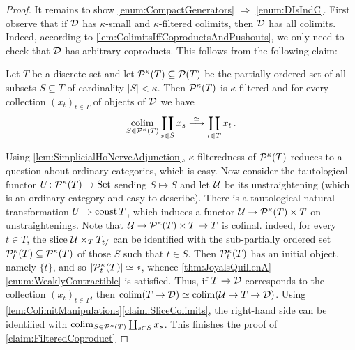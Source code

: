 \begin{proof}
	It remains to show \cref{enum:CompactGenerators} $\Rightarrow$ \cref{enum:DIsIndC}. First observe that if $\mathcal{D}$ has $\kappa$-small and $\kappa$-filtered colimits, then $\mathcal{D}$ has all colimits. Indeed, according to \cref{lem:ColimitsIffCoproductsAndPushouts}, we only need to check that $\mathcal{D}$ has arbitrary coproducts. This follows from the following claim:
	\begin{alphanumerate}\itshape
		\item[\boxtimes] Let $T$ be a discrete set and let $\mathcal{P}^{\kappa}(T)\subseteq \mathcal{P}(T)$ be the partially ordered set of all subsets $S\subseteq T$ of cardinality $\left|S\right|<\kappa$. Then $\mathcal{P}^{\kappa}(T)$ is $\kappa$-filtered and for every collection $(x_t)_{t\in T}$ of objects of $\mathcal{D}$ we have\label{claim:FilteredCoproduct}
		\begin{equation*}
			\operatorname*{colim}_{S\in\mathcal{P}^{\kappa}(T)}\coprod_{s\in S}x_s\overset{\simeq}{\longrightarrow}\coprod_{t\in T}x_t\,.
		\end{equation*}
	\end{alphanumerate}
	Using \cref{lem:SimplicialHoNerveAdjunction}, $\kappa$-filteredness of $\mathcal{P}^\kappa(T)$ reduces to a question about ordinary categories, which is easy. Now consider the tautological functor $U\colon \mathcal{P}^\kappa(T)\rightarrow\mathrm{Set}$ sending $S\mapsto S$ and let $\mathcal{U}$ be its unstraightening (which is an ordinary category and easy to describe). There is a tautological natural transformation $U\Rightarrow\operatorname{const} T$, which induces a functor $\mathcal{U}\rightarrow \mathcal{P}^\kappa(T)\times T$ on unstraightenings. Note that $\mathcal{U}\rightarrow \mathcal{P}^\kappa(T)\times T\rightarrow T$ is cofinal. indeed, for every $t\in T$, the slice $\mathcal{U}\times_TT_{t/}$ can be identified with the sub-partially ordered set $\mathcal{P}_t^\kappa(T)\subseteq \mathcal{P}^\kappa(T)$ of those $S$ such that $t\in S$. Then $\mathcal{P}_t^\kappa(T)$ has an initial object, namely $\{t\}$, and so $\mathopen|\mathcal{P}_t^\kappa(T)\mathclose|\simeq *$, whence \cref{thm:JoyalsQuillenA}\cref{enum:WeaklyContractible} is satisfied. Thus, if $T\rightarrow \mathcal{D}$ corresponds to the collection $(x_t)_{t\in T}$, then $\operatorname*{colim}(T\rightarrow\mathcal{D})\simeq \operatorname*{colim}(\mathcal{U}\rightarrow T\rightarrow\mathcal{D})$. Using \cref{lem:ColimitManipulations}\cref{claim:SliceColimits}, the right-hand side can be identified with $\operatorname*{colim}_{S\in\mathcal{P}^\kappa(T)}\coprod_{s\in S}x_s$. This finishes the proof of \cref{claim:FilteredCoproduct}
	

\end{proof}
